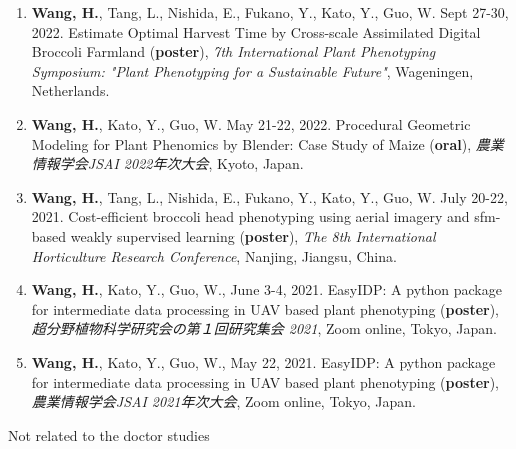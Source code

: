 \begin{singlespace}
\begin{enumerate}
  \item \textbf{Wang, H.}, Tang, L., Nishida, E., Fukano, Y., Kato, Y., Guo, W. Sept 27-30, 2022. Estimate Optimal Harvest Time by Cross-scale Assimilated Digital Broccoli Farmland (\textbf{poster}), \textit{7th International Plant Phenotyping Symposium: "Plant Phenotyping for a Sustainable Future"}, Wageningen, Netherlands.
  \item \textbf{Wang, H.}, Kato, Y., Guo, W. May 21-22, 2022. Procedural Geometric Modeling for Plant Phenomics by Blender: Case Study of Maize (\textbf{oral}), \textit{農業情報学会JSAI 2022年次大会}, Kyoto, Japan.
  \item \textbf{Wang, H.}, Tang, L., Nishida, E., Fukano, Y., Kato, Y., Guo, W. July 20-22, 2021. Cost-efficient broccoli head phenotyping using aerial imagery and \gls{sfm}-based weakly supervised learning (\textbf{poster}), \textit{The 8th International Horticulture Research Conference}, Nanjing, Jiangsu, China.
  \item \textbf{Wang, H.}, Kato, Y., Guo, W., June 3-4, 2021. EasyIDP: A python package for intermediate data processing in UAV based plant phenotyping (\textbf{poster}), \textit{超分野植物科学研究会の第１回研究集会 2021}, Zoom online, Tokyo, Japan.
  \item \textbf{Wang, H.}, Kato, Y., Guo, W., May 22, 2021. EasyIDP: A python package for intermediate data processing in UAV based plant phenotyping (\textbf{poster}), \textit{農業情報学会JSAI 2021年次大会}, Zoom online, Tokyo, Japan.
\end{enumerate}

\noindent
Not related to the doctor studies


\end{singlespace}
